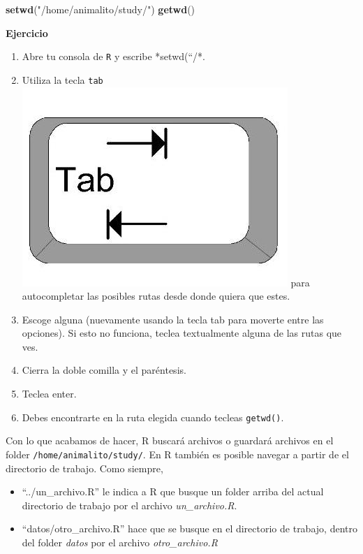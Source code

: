 \documentclass[]{article}
\newenvironment{Shaded}{\begin{snugshade}}{\end{snugshade}}
\newcommand{\KeywordTok}[1]{\textcolor[rgb]{0.13,0.29,0.53}{\textbf{{#1}}}}
\newcommand{\StringTok}[1]{\textcolor[rgb]{0.31,0.60,0.02}{{#1}}}
\newcommand{\NormalTok}[1]{{#1}}
\providecommand{\tightlist}{%
  \setlength{\itemsep}{0pt}\setlength{\parskip}{0pt}}
\begin{document}
\begin{Shaded}
\begin{Highlighting}[]
\KeywordTok{setwd}\NormalTok{(}\StringTok{"/home/animalito/study/"}\NormalTok{)}
\KeywordTok{getwd}\NormalTok{()}
\end{Highlighting}
\end{Shaded}

\textbf{Ejercicio}

\begin{enumerate}
\def\labelenumi{\arabic{enumi}.}
\tightlist
\item
  Abre tu consola de \texttt{R} y escribe *setwd(``/*.
\item
  Utiliza la tecla \texttt{tab}
  \includegraphics[scale=0.5]{../img/tab_key.jpg} para autocompletar las
  posibles rutas desde donde quiera que estes.
\item
  Escoge alguna (nuevamente usando la tecla tab para moverte entre las
  opciones). Si esto no funciona, teclea textualmente alguna de las
  rutas que ves.
\item
  Cierra la doble comilla y el paréntesis.
\item
  Teclea enter.
\item
  Debes encontrarte en la ruta elegida cuando tecleas \texttt{getwd()}.
\end{enumerate}

Con lo que acabamos de hacer, R buscará archivos o guardará archivos en
el folder \texttt{/home/animalito/study/}. En R también es posible
navegar a partir de el directorio de trabajo. Como siempre,

\begin{itemize}
\tightlist
\item
  ``../un\_archivo.R'' le indica a R que busque un folder arriba del
  actual directorio de trabajo por el archivo \emph{un\_archivo.R}.
\item
  ``datos/otro\_archivo.R'' hace que se busque en el directorio de
  trabajo, dentro del folder \emph{datos} por el archivo
  \emph{otro\_archivo.R}
\end{itemize}
\end{document}
